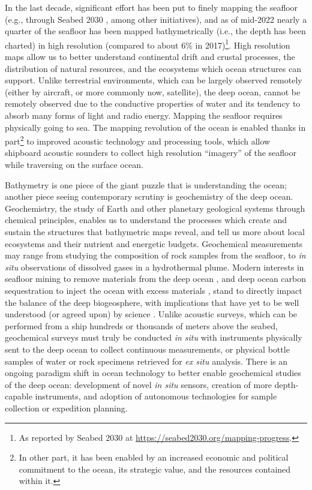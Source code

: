 In the last decade, significant effort has been put to finely mapping the seafloor (e.g., through Seabed 2030 \autocite{mayer2018nippon}, among other initiatives), and as of mid-2022 nearly a quarter of the seafloor has been mapped bathymetrically (i.e., the depth has been charted) in high resolution (compared to about 6\% in 2017)\footnote{As reported by Seabed 2030 at \url{https://seabed2030.org/mapping-progress}.}. 
High resolution maps allow us to better understand continental drift and crustal processes, the distribution of natural resources, and the ecosystems which ocean structures can support.
Unlike terrestrial environments, which can be largely observed remotely (either by aircraft, or more commonly now, satellite), the deep ocean, cannot be remotely observed due to the conductive properties of water and its tendency to absorb many forms of light and radio energy.
Mapping the seafloor requires physically going to sea.
The mapping revolution of the ocean is enabled thanks in part\footnote{In other part, it has been enabled by an increased economic and political commitment to the ocean, its strategic value, and the resources contained within it.} to improved acoustic technology and processing tools, which allow shipboard acoustic sounders to collect high resolution ``imagery'' of the seafloor while traversing on the surface ocean.

Bathymetry is one piece of the giant puzzle that is understanding the ocean; another piece seeing contemporary scrutiny is geochemistry of the deep ocean.
Geochemistry, the study of Earth and other planetary geological systems through chemical principles, enables us to understand the processes which create and sustain the structures that bathymetric maps reveal, and tell us more about local ecosystems and their nutrient and energetic budgets. 
Geochemical measurements may range from studying the composition of rock samples from the seafloor, to \emph{in situ} observations of dissolved gases in a hydrothermal plume.
Modern interests in seafloor mining to remove materials from the deep ocean \autocite{thompson2018seabed}, and deep ocean carbon sequestration to inject the ocean with excess materials \autocite{teng2018long}, stand to directly impact the balance of the deep biogeosphere, with implications that have yet to be well understood (or agreed upon) by science \autocite{smith2020deep,seibel2001potential,fleeger2010response,sharma2015environmental,childs2020extraction,van2011tighten}.
Unlike acoustic surveys, which can be performed from a ship hundreds or thousands of meters above the seabed, geochemical surveys must truly be conducted \emph{in situ} with instruments physically sent to the deep ocean to collect continuous measurements, or physical bottle samples of water or rock specimens retrieved for \emph{ex situ} analysis.
There is an ongoing paradigm shift in ocean technology to better enable geochemical studies of the deep ocean: development of novel \emph{in situ} sensors, creation of more depth-capable instruments, and adoption of autonomous technologies for sample collection or expedition planning. 

